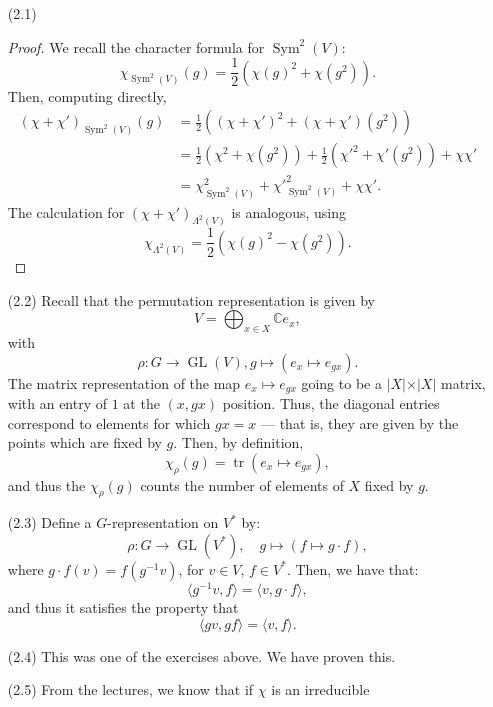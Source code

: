 \documentclass[a4paper]{report}
\theoremstyle{definition}
\theoremstyle{remark}
\theoremstyle{proposition}
\theoremstyle{conjecture}
\theoremstyle{lemma}
\theoremstyle{corollary}
\theoremstyle{exercise}
\theoremstyle{example}
\newcommand{\C}{\mathbb{C}}
\newcommand{\on}{\operatorname}
\begin{document}
\begin{enumerate}
    \item[(2.1)] \begin{proof}
            We recall the character formula for $\on{Sym}^2(V)$:
            $$\chi_{\on{Sym}^2(V)}(g) = \frac{1}{2}(\chi(g)^2 + \chi(g^2)).$$
            Then, computing directly,
            \begin{align*}
                (\chi+\chi')_{\on{Sym}^2(V)}(g) &= \frac{1}{2}( (\chi + \chi')^2 + (\chi + \chi')(g^2))\\
                                                &= \frac{1}{2}(\chi^2 + \chi(g^2)) + \frac{1}{2}(\chi'^2 + \chi'(g^2)) + \chi\chi'\\ 
                                                &= \chi^2_{\on{Sym}^2(V)} + \chi'^{2}_{\on{Sym}^2(V)} + \chi \chi'.
            \end{align*}
            The calculation for $(\chi + \chi')_{\Lambda^2(V)}$ is analogous,
            using 
            $$\chi_{\Lambda^2(V)} = \frac{1}{2}(\chi(g)^2 - \chi(g^2)).$$
        \end{proof}
    \item[(2.2)]
        Recall that the permutation representation is given by 
        $$V = \bigoplus_{x\in X}\C e_x,$$
        with 
        $$\rho : G \longrightarrow \on{GL}(V), g\longmapsto (e_x\longmapsto e_{gx}).$$
        The matrix representation of the map $e_x\mapsto e_{gx}$ going to 
        be a $\vert X \vert \times \vert X \vert$ matrix, with an entry 
        of $1$ at the $(x,gx)$ position. Thus, the diagonal entries 
        correspond to elements for which $gx = x$ --- that is, they 
        are given by the points which are fixed by $g$.
        Then, by definition, 
        $$\chi_\rho(g) = \on{tr}(e_x \mapsto e_{gx}),$$
        and thus the $\chi_\rho(g)$ counts the number of elements of $X$
        fixed by $g$.
    \item[(2.3)] Define a $G$-representation on $V^\ast$ by:
        $$\rho : G \longrightarrow \on{GL}(V^\ast),\quad g\longmapsto(f\longmapsto g\cdot f),$$
        where $g\cdot f(v) = f(g^{-1}v)$, for $v\in V$, $f\in V^\ast$.
        Then, we have that:
        $$\langle g^{-1}v, f\rangle = \langle v,g\cdot f\rangle,$$
        and thus it satisfies the property that
        $$\langle gv,gf\rangle = \langle v,f\rangle.$$
    \item[(2.4)] This was one of the exercises above. We have proven this.
    \item[(2.5)] From the lectures, we know that if $\chi$ is an irreducible

\end{enumerate}
\end{document}
